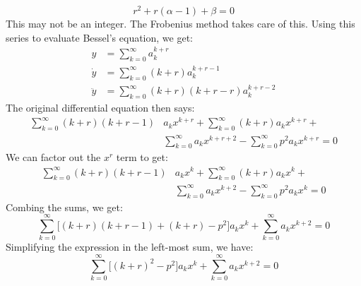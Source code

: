         \begin{equation}
            r^{2}+r(\alpha-1)+\beta=0
        \end{equation}
        This may not be an integer. The Frobenius method takes care
        of this. Using this series to evaluate Bessel's equation,
        we get:
        \begin{subequations}
            \begin{align}
                y&=\sum_{k=0}^{\infty}a_{k}^{k+r}\\
                \dot{y}&=\sum_{k=0}^{\infty}(k+r)a_{k}^{k+r-1}\\
                \ddot{y}&=\sum_{k=0}^{\infty}(k+r)(k+r-r)a_{k}^{k+r-2}
            \end{align}
        \end{subequations}
        The original differential equation then says:
        \begin{equation}
            \begin{split}
                \sum_{k=0}^{\infty}(k+r)(k+r-1)&a_{k}x^{k+r}+
                \sum_{k=0}^{\infty}(k+r)a_{k}x^{k+r}+\\
                &\sum_{k=0}^{\infty}a_{k}x^{k+r+2}-
                \sum_{k=0}^{\infty}p^{2}a_{k}x^{k+r}=0
            \end{split}
        \end{equation}
        We can factor out the $x^{r}$ term to get:
        \begin{equation}
            \begin{split}
                \sum_{k=0}^{\infty}(k+r)(k+r-1)&a_{k}x^{k}+
                \sum_{k=0}^{\infty}(k+r)a_{k}x^{k}+\\
                &\sum_{k=0}^{\infty}a_{k}x^{k+2}-
                \sum_{k=0}^{\infty}p^{2}a_{k}x^{k}=0
            \end{split}
        \end{equation}
        Combing the sums, we get:
        \begin{equation}
            \sum_{k=0}^{\infty}\Big[(k+r)(k+r-1)+(k+r)-p^{2}\Big]
                a_{k}x^{k}+
            \sum_{k=0}^{\infty}a_{k}x^{k+2}=0
        \end{equation}
        Simplifying the expression in the left-most sum, we have:
        \begin{equation}
            \sum_{k=0}^{\infty}\Big[(k+r)^{2}-p^{2}\Big]
                a_{k}x^{k}+
            \sum_{k=0}^{\infty}a_{k}x^{k+2}=0
        \end{equation}
